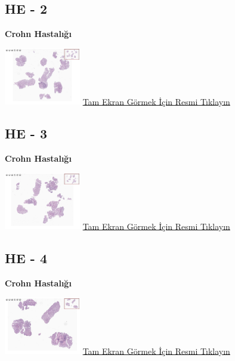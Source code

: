 \documentclass[
  letterpaper,
  DIV=11,
  numbers=noendperiod]{scrreprt}
\begin{document}
\hypertarget{he---2}{%
\subsection{HE - 2}\label{he---2}}

\textbf{Crohn Hastalığı}

\href{https://images.patolojiatlasi.com/crohn-colonoscopic-biopsy/HE2.html}{\includegraphics[width=0.25\textwidth,height=\textheight]{./screenshots/thumbnail_crohn-colonoscopic-biopsy-HE2.png}}
\href{https://images.patolojiatlasi.com/crohn-colonoscopic-biopsy/HE2.html}{Tam
Ekran Görmek İçin Resmi Tıklayın}

\hypertarget{he---3}{%
\subsection{HE - 3}\label{he---3}}

\textbf{Crohn Hastalığı}

\href{https://images.patolojiatlasi.com/crohn-colonoscopic-biopsy/HE3.html}{\includegraphics[width=0.25\textwidth,height=\textheight]{./screenshots/thumbnail_crohn-colonoscopic-biopsy-HE3.png}}
\href{https://images.patolojiatlasi.com/crohn-colonoscopic-biopsy/HE3.html}{Tam
Ekran Görmek İçin Resmi Tıklayın}

\hypertarget{he---4}{%
\subsection{HE - 4}\label{he---4}}

\textbf{Crohn Hastalığı}

\href{https://images.patolojiatlasi.com/crohn-colonoscopic-biopsy/HE4.html}{\includegraphics[width=0.25\textwidth,height=\textheight]{./screenshots/thumbnail_crohn-colonoscopic-biopsy-HE4.png}}
\href{https://images.patolojiatlasi.com/crohn-colonoscopic-biopsy/HE4.html}{Tam
Ekran Görmek İçin Resmi Tıklayın}
\end{document}
